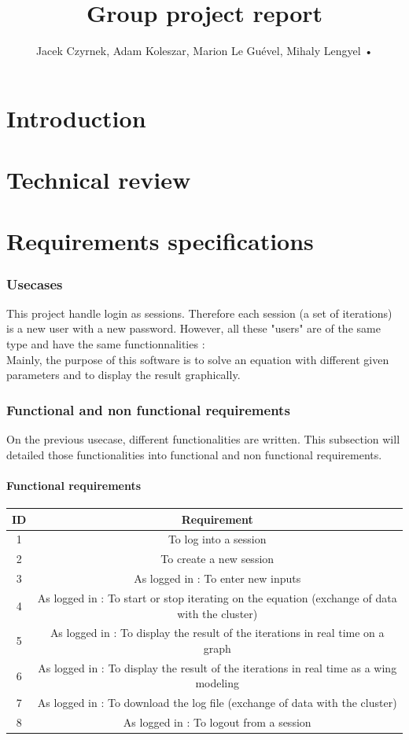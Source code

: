 \documentclass[10pt,a4paper]{report}
\author{Jacek Czyrnek, Adam Koleszar, Marion Le Guével, Mihaly Lengyel
•
}
\title{Group project report}
\begin{document}
\chapter{Introduction}


\chapter{Technical review}


\chapter{Requirements specifications}
	\subsection{Usecases}
This project handle login as sessions. Therefore each session (a set of iterations) is a new user with a new password.  However, all these "users" are of the same type and have the same functionnalities : \\
Mainly, the purpose of this software is to solve an equation with different given parameters and to display the result graphically.
	\subsection{Functional and non functional requirements}
On the previous usecase, different functionalities are written. This subsection will detailed those functionalities into functional and non functional requirements.
		\subsubsection{Functional requirements}
\begin{tabular}{|c|c|}
\hline 
\textbf{ID} & \textbf{Requirement} \\ 
\hline 
1 & To log into a session \\ 
\hline 
2 & To create a new session \\ 
\hline 
3 & As logged in : To enter new inputs \\ 
\hline
4 & As logged in : To start or stop iterating on the equation (exchange of data with the cluster) \\ 
\hline
5 & As logged in : To display the result of the iterations in real time on a graph \\ 
\hline
6 & As logged in : To display the result of the iterations in real time as a wing modeling \\ 
\hline
7 & As logged in : To download the log file (exchange of data with the cluster)\\ 
\hline
8 & As logged in : To logout from a session \\ 
\hline
\end{tabular} 
\end{document}
